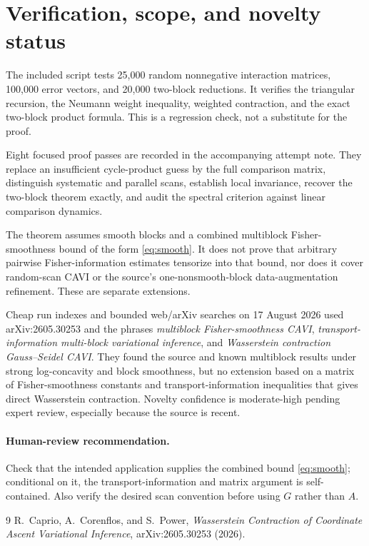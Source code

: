 \documentclass[11pt]{article}
\begin{document}
\section*{Verification, scope, and novelty status}

The included script tests 25,000 random nonnegative interaction matrices,
100,000 error vectors, and 20,000 two-block reductions.  It verifies the
triangular recursion, the Neumann weight inequality, weighted contraction,
and the exact two-block product formula.  This is a regression check, not a
substitute for the proof.

Eight focused proof passes are recorded in the accompanying attempt note.
They replace an insufficient cycle-product guess by the full comparison
matrix, distinguish systematic and parallel scans, establish local
invariance, recover the two-block theorem exactly, and audit the spectral
criterion against linear comparison dynamics.

The theorem assumes smooth blocks and a combined multiblock
Fisher-smoothness bound of the form \eqref{eq:smooth}.  It does not prove that
arbitrary pairwise Fisher-information estimates tensorize into that bound,
nor does it cover random-scan CAVI or the source's one-nonsmooth-block
data-augmentation refinement.  These are separate extensions.

Cheap run indexes and bounded web/arXiv searches on 17 August 2026 used
arXiv:2605.30253 and the phrases \emph{multiblock Fisher-smoothness CAVI},
\emph{transport-information multi-block variational inference}, and
\emph{Wasserstein contraction Gauss--Seidel CAVI}.  They found the source and
known multiblock results under strong log-concavity and block smoothness, but
no extension based on a matrix of Fisher-smoothness constants and
transport-information inequalities that gives direct Wasserstein contraction.
Novelty confidence is moderate-high pending expert review, especially because
the source is recent.

\paragraph{Human-review recommendation.}
Check that the intended application supplies the combined bound
\eqref{eq:smooth}; conditional on it, the transport-information and matrix
argument is self-contained.  Also verify the desired scan convention before
using $G$ rather than $A$.

\begin{thebibliography}{9}
R.~Caprio, A.~Corenflos, and S.~Power,
\emph{Wasserstein Contraction of Coordinate Ascent Variational Inference},
arXiv:2605.30253 (2026).
\end{thebibliography}
\end{document}
